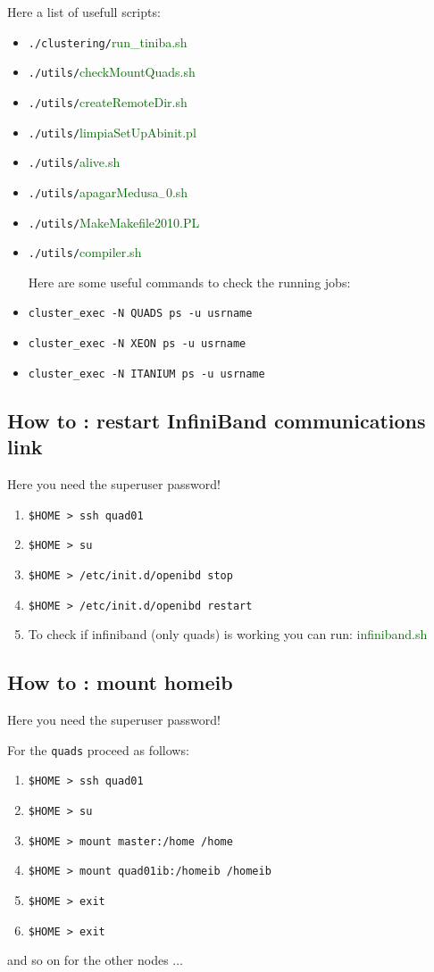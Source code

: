 \documentclass[12pt,leqno]{article}
\numberwithin{equation}{section}
\begin{document}
Here a list of usefull scripts:
\begin{itemize}
\item \verb=./clustering/=\textcolor{darkgreen}{run\_tiniba.sh}
\item \verb=./utils/=\textcolor{darkgreen}{checkMountQuads.sh}
\item \verb=./utils/=\textcolor{darkgreen}{createRemoteDir.sh}
\item \verb=./utils/=\textcolor{darkgreen}{limpiaSetUpAbinit.pl}
\item \verb=./utils/=\textcolor{darkgreen}{alive.sh}
\item \verb=./utils/=\textcolor{darkgreen}{apagarMedusa$_{-}0$.sh}
\item \verb=./utils/=\textcolor{darkgreen}{MakeMakefile2010.PL}
\item \verb=./utils/=\textcolor{darkgreen}{compiler.sh}

Here are some useful commands to check the running jobs:
\item \verb=cluster_exec -N QUADS ps -u usrname=
\item \verb=cluster_exec -N XEON ps -u usrname=
\item \verb=cluster_exec -N ITANIUM ps -u usrname=
\end{itemize} 
\subsection{How to : restart InfiniBand communications link }
Here you need the superuser password! 
\begin{enumerate}
\item \verb=$HOME > ssh quad01=  
\item \verb=$HOME > su=
\item \verb=$HOME > /etc/init.d/openibd stop=
\item \verb=$HOME > /etc/init.d/openibd restart=
\item To check if infiniband (only quads) is working you can run:
\textcolor{darkgreen}{infiniband.sh}
\end{enumerate}
\subsection{How to : mount  homeib}
Here you need the superuser password!  

For the \verb=quads= proceed as follows:
\begin{enumerate}
\item \verb=$HOME > ssh quad01=  
\item \verb=$HOME > su=
\item \verb=$HOME > mount master:/home /home=
\item \verb=$HOME > mount quad01ib:/homeib /homeib=
\item \verb=$HOME > exit=
\item \verb=$HOME > exit=
\end{enumerate}
and so on for the other nodes $\ldots$
\end{document}

